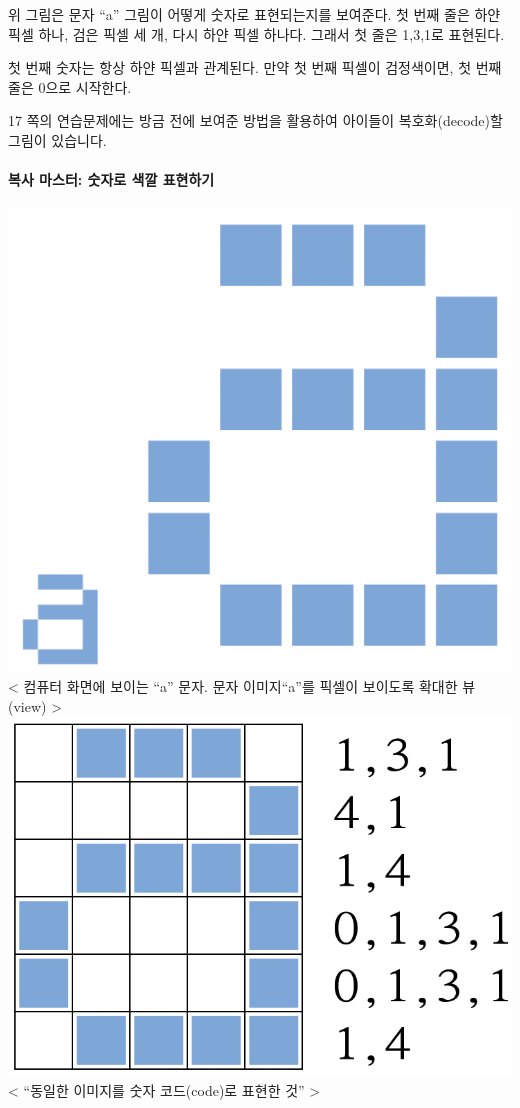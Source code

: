 \documentclass[]{article}
\begin{document}
위 그림은 문자 ``a'' 그림이 어떻게 숫자로 표현되는지를 보여준다. 첫 번째
줄은 하얀 픽셀 하나, 검은 픽셀 세 개, 다시 하얀 픽셀 하나다. 그래서 첫
줄은 1,3,1로 표현된다.

첫 번째 숫자는 항상 하얀 픽셀과 관계된다. 만약 첫 번째 픽셀이
검정색이면, 첫 번째 줄은 0으로 시작한다.

17 쪽의 연습문제에는 방금 전에 보여준 방법을 활용하여 아이들이
복호화(decode)할 그림이 있습니다.

\mbox{}\paragraph{복사 마스터: 숫자로 색깔 표현하기}\label{section-34}

\includegraphics{csunplugged/01-part/img/ch02-img/02-image-02-master-01.png}
\textless{} 컴퓨터 화면에 보이는 ``a'' 문자. 문자 이미지``a''를 픽셀이
보이도록 확대한 뷰(view) \textgreater{}
\includegraphics{csunplugged/01-part/img/ch02-img/02-image-01-a-02.png}
\textless{} ``동일한 이미지를 숫자 코드(code)로 표현한 것''
\textgreater{}
\end{document}
